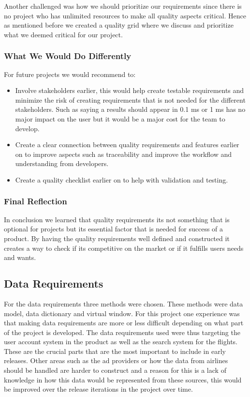 Another challenged was how we should prioritize our requirements since there is no project who has unlimited resources to make all quality aspects critical. Hence as mentioned before we created a quality grid where we discuss and prioritize what we deemed critical for our project.


\subsubsection{What We Would Do Differently}
For future projects we would recommend to:
\begin{itemize}
    \item Involve stakeholders earlier, this would help create testable requirements and minimize the risk of creating requirements that is not needed for the different stakeholders. Such as saying a results should appear in 0.1 ms or 1 ms has no major impact on the user but it would be a major cost for the team to develop.
    \item Create a clear connection between quality requirements and features earlier on to improve aspects such as traceability and improve the workflow and understanding from developers.
    \item Create a quality checklist earlier on to help with validation and testing.
\end{itemize}

\subsubsection{Final Reflection}
In conclusion we learned that quality requirements its not something that is optional for projects but its essential factor that is needed for success of a product. By having the quality requirements well defined and constructed it creates a way to check if its competitive on the market or if it fulfills users needs and wants.



\subsection{Data Requirements}

For the data requirements three methods were chosen. These methods were data model, data dictionary and virtual window. For this project one experience was that
making data requirements are more or less difficult depending on what part of the project is developed. The data requirements used were thus targeting the user
account system in the product as well as the search system for the flights. These are the crucial parts that are the most important to include in early releases.
Other areas such as the ad providers or how the data from airlines should be handled are harder to construct and a reason for this is a lack of knowledge in
how this data would be represented from these sources, this would be improved over the release iterations in the project over time.


